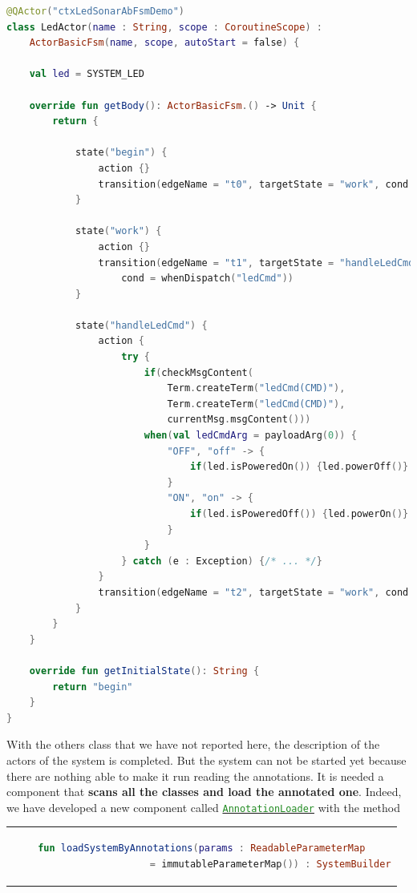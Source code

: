 \begin{lstlisting}[caption=\texttt{LedActor (\texttt{ledsonarsystem0})},language=Kotlin]
@QActor("ctxLedSonarAbFsmDemo")
class LedActor(name : String, scope : CoroutineScope) :
	ActorBasicFsm(name, scope, autoStart = false) {

	val led = SYSTEM_LED

	override fun getBody(): ActorBasicFsm.() -> Unit {
		return {
			
			state("begin") {
				action {}
				transition(edgeName = "t0", targetState = "work", cond = doswitch())
			}
			
			state("work") {
				action {}
				transition(edgeName = "t1", targetState = "handleLedCmd",
					cond = whenDispatch("ledCmd"))
			}
			
			state("handleLedCmd") {
				action {
					try {
						if(checkMsgContent(
							Term.createTerm("ledCmd(CMD)"),
							Term.createTerm("ledCmd(CMD)"),
							currentMsg.msgContent()))
						when(val ledCmdArg = payloadArg(0)) {
							"OFF", "off" -> {
								if(led.isPoweredOn()) {led.powerOff()}
							}
							"ON", "on" -> {
								if(led.isPoweredOff()) {led.powerOn()}
							}
						}
					} catch (e : Exception) {/* ... */}
				}
				transition(edgeName = "t2", targetState = "work", cond = doswitch())
			}
		}
	}

	override fun getInitialState(): String {
		return "begin"
	}
}
\end{lstlisting}

With the others class that we have not reported here, the description of the actors of the system is completed. But the system can not be started yet because there are nothing able to make it run reading the annotations. It is needed a component that \textbf{scans all the classes and load the annotated one}.
Indeed, we have developed a new component called \href{https://github.com/LM-96/QA-Extensions/blob/main/it.unibo.qakactor/src/main/kotlin/annotations/AnnotationLoader.kt}{\textcolor{ForestGreen}{\texttt{AnnotationLoader}}} with the method 
\begin{center}
	\begin{tabular}{c}
		\begin{lstlisting}[frame=none,numbers=none,language=Kotlin]
			fun loadSystemByAnnotations(params : ReadableParameterMap
						= immutableParameterMap()) : SystemBuilder
		\end{lstlisting}
	\end{tabular}
\end{center}

